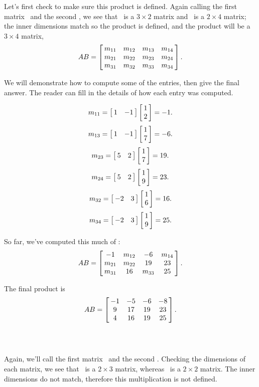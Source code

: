 {Let's first check to make sure this product is defined. Again calling the first matrix \tta\ and the second \ttb, we see that \tta\ is a $3\times 2$ matrix and \ttb\ is a $2\times4$ matrix; the inner dimensions match so the product is defined, and the product will be a $3\times 4$ matrix, $$\tta\ttb = \bmx{cccc}m_{11}&m_{12}&m_{13}&m_{14}\\ m_{21}&m_{22}&m_{23}&m_{24}\\m_{31}&m_{32}&m_{33}&m_{34}\emx.$$

We will demonstrate how to compute some of the entries, then give the final answer. The reader can fill in the details of how each entry was computed.

$$m_{11} = \bmx{cc}1&-1\emx\bmx{c}1\\2\emx = -1.$$ 
$$m_{13} = \bmx{cc}1&-1\emx\bmx{c}1\\7\emx = -6.$$ 
$$m_{23} = \bmx{cc}5&2\emx\bmx{c}1\\7\emx = 19.$$
$$m_{24} = \bmx{cc}5&2\emx\bmx{c}1\\9\emx = 23.$$
$$m_{32} = \bmx{cc}-2&3\emx\bmx{c}1\\6\emx = 16.$$
$$m_{34} = \bmx{cc}-2&3\emx\bmx{c}1\\9\emx = 25.$$

So far, we've computed this much of \tta\ttb: $$\tta\ttb = \bmx{cccc}-1&m_{12}&-6&m_{14}\\ m_{21}&m_{22}&19&23\\m_{31}&16&m_{33}&25\emx.$$

The final product is $$\tta\ttb = \bmx{cccc}-1&-5&-6&-8\\ 9&17&19&23\\4&16&19&25\emx.$$ \ }\\

{Again, we'll call the first matrix \tta\ and the second \ttb. Checking the dimensions of each matrix, we see that \tta\ is a $2\times 3$ matrix, whereas \ttb\ is a $2\times2$ matrix. The inner dimensions do not match, therefore this multiplication is not defined.}\\ %

